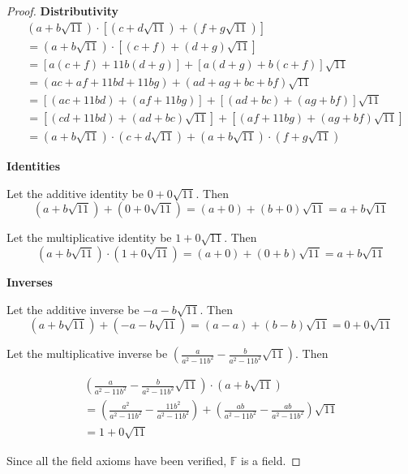 \documentclass[12pt, a4paper]{article}
\newcommand{\F}{\mathbb{F}}
\begin{document}
\begin{proof}
    \vspace{5mm}
    \textbf{Distributivity}
    \begin{align*}
        & (a + b\sqrt{11}) \cdot \left[(c + d\sqrt{11}) + (f + g\sqrt{11})\right]\\
        & = (a + b\sqrt{11}) \cdot \left[(c + f) + (d + g)\sqrt{11}\right]\\
        & = \left[a(c + f) + 11b(d + g)\right] + \left[a(d + g) + b(c + f)\right]\sqrt{11}\\
        & = (ac + af + 11bd + 11bg) + (ad + ag + bc + bf)\sqrt{11}\\
        & = \left[(ac + 11bd) + (af + 11bg)\right] + \left[(ad + bc) + (ag + bf)\right]\sqrt{11}\\
        & = \left[(cd + 11bd) + (ad + bc)\sqrt{11}\right]
          + \left[(af + 11bg) + (ag + bf)\sqrt{11}\right]\\
        & = (a + b\sqrt{11}) \cdot (c + d\sqrt{11})
          + (a + b\sqrt{11}) \cdot (f + g\sqrt{11})
    \end{align*}

    \newpage

    \textbf{Identities}
    
    Let the additive identity be $0 + 0\sqrt{11}$. Then
    \[
        (a + b\sqrt{11}) + (0 + 0\sqrt{11}) = (a + 0) + (b + 0)\sqrt{11}
        = a + b\sqrt{11}
    \]

    Let the multiplicative identity be $1 + 0\sqrt{11}$. Then
    \[
        (a + b\sqrt{11}) \cdot (1 + 0\sqrt{11}) = (a + 0) + (0 + b)\sqrt{11}
        = a + b\sqrt{11}
    \]

    \textbf{Inverses}

    Let the additive inverse be $-a - b\sqrt{11}$. Then
    \[
        (a + b\sqrt{11}) + (-a - b\sqrt{11}) = (a - a) + (b - b)\sqrt{11}
        = 0 + 0\sqrt{11}
    \]

    Let the multiplicative inverse be
    $\displaystyle{\left(\frac{a}{a^2 - 11b^2} - \frac{b}{a^2 - 11b^2}\sqrt{11}\right)}$.
    Then

    \begin{gather*}
        \left(\frac{a}{a^2 - 11b^2} - \frac{b}{a^2 - 11b^2}\sqrt{11}\right) \cdot (a + b\sqrt{11})\\
        = \left(\frac{a^2}{a^2 - 11b^2} - \frac{11b^2}{a^2 - 11b^2}\right) 
        + \left(\frac{ab}{a^2 - 11b^2} - \frac{ab}{a^2 - 11b^2}\right)\sqrt{11}\\
        = 1 + 0\sqrt{11}
    \end{gather*}

    Since all the field axioms have been verified, $\F$ is a field.
\end{proof}
\end{document}
